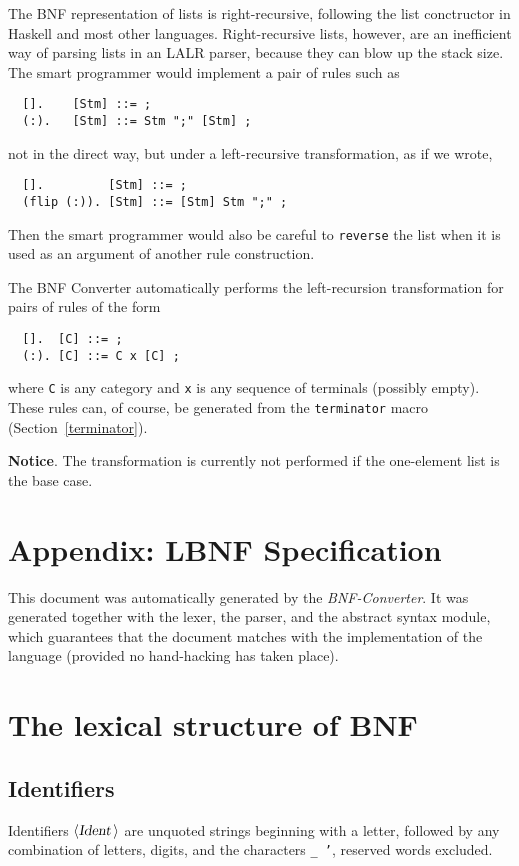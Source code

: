 \documentclass[10pt]{article}
\newcommand{\nonterminal}[1]{\mbox{$\langle \mbox{{\sl #1 }} \! \rangle$}}
\begin{document}
The BNF representation of lists is right-recursive, following the
list conctructor in Haskell and most other languages. 
Right-recursive lists, however, are an inefficient way of parsing
lists in an LALR parser, because they can blow up the stack size.
The smart programmer would implement a pair of rules
such as
\begin{verbatim}
  [].    [Stm] ::= ;
  (:).   [Stm] ::= Stm ";" [Stm] ;
\end{verbatim}
not in the direct way,
but under a left-recursive transformation, as if we wrote,
\begin{verbatim}
  [].         [Stm] ::= ;
  (flip (:)). [Stm] ::= [Stm] Stm ";" ;
\end{verbatim}
Then the smart programmer would also be careful to {\tt reverse} the list
when it is used as an argument of another rule construction.

The BNF Converter automatically performs the
left-recursion transformation for
pairs of rules of the form
\begin{verbatim}
  [].  [C] ::= ;
  (:). [C] ::= C x [C] ;
\end{verbatim}
where {\tt C} is any category and {\tt x} is any sequence of
terminals (possibly empty). These rules can, of course, be generated from
the {\tt terminator} macro (Section~\ref{terminator}).

{\bf Notice}. The transformation is currently not performed if the
one-element list is the base case.


\newpage

\section*{Appendix: LBNF Specification}

This document was automatically generated by the {\em BNF-Converter}. It was generated together with the lexer, the parser, and the abstract syntax module, which guarantees that the document matches with the implementation of the language (provided no hand-hacking has taken place).

\section*{The lexical structure of BNF}
\subsection*{Identifiers}
Identifiers \nonterminal{Ident} are unquoted strings beginning with a letter,
followed by any combination of letters, digits, and the characters {\tt \_ '},
reserved words excluded.
\end{document}
